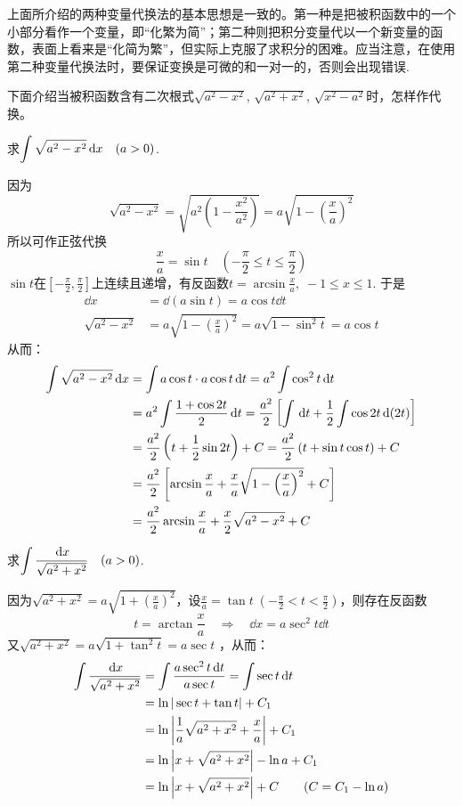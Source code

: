 上面所介绍的两种变量代换法的基本思想是一致的。第一种是把被积函数中的一个小部分看作一个变量，即“化繁为简”；第二种则把积分变量代以一个新变量的函数，表面上看来是“化简为繁”，但实际上克服了求积分的困难。应当注意，在使用第二种变量代换法时，要保证变换是可微的和一对一的，否则会出现错误.

下面介绍当被积函数含有二次根式$\sqrt{a^2-x^2}$, $\sqrt{a^2+x^2}$, $\sqrt{x^2-a^2}$时，怎样作代换。

\begin{example}
    求$\displaystyle\int \sqrt{a^2-x^2}\,{\rm d} x\quad (a>0)$.
\end{example}

\begin{solution}
因为\[\sqrt{a^2-x^2}=\sqrt{a^2\left(1-\frac{x^2}{a^2}\right)}=a\sqrt{1-\left(\frac{x}{a}\right)^2}\]
所以可作正弦代换
\[\frac{x}{a}=\sin t\quad \left(-\frac{\pi}{2}\le t\le \frac{\pi}{2}\right)\]
$\sin t$在$\left[-\frac{\pi}{2},\frac{\pi}{2}\right]$上连续且递增，有反函数$t=\arcsin\frac{x}{a},\; -1\le x\le 1$. 于是
\[\begin{split}
    \dd x&=\dd (a\sin t)=a\cos t\dd t\\
    \sqrt{a^2-x^2}&=a\sqrt{1-\left(\frac{x}{a}\right)^2}=a\sqrt{1-\sin^2 t}=a\cos t
\end{split}\]
从而：
\[\begin{split}
    \displaystyle\int \sqrt{a^2-x^2}\,{\rm d} x&=\int a\cos t\cdot a\cos t\,{\rm d} t=a^2\int \cos^2 t\,{\rm d} t\\ 
&=a^2\int \dfrac{1+\cos 2t}{2}\,{\rm d} t=\dfrac{a^2}{2}\left[\int \,{\rm d} t+\dfrac{1}{2}\int \cos 2t\,{\rm d} (2t)\right]\\
&=\dfrac{a^2}{2}\left(t+\dfrac{1}{2}\sin 2t\right)+C=\dfrac{a^2}{2}\left(t+\sin t\cos t\right)+C\\
&=\dfrac{a^2}{2}\left[\arcsin\dfrac{x}{a}+\dfrac{x}{a}\sqrt{1-\left(\dfrac{x}{a}\right)^2}+C\right]\\
&=\dfrac{a^2}{2}\arcsin\dfrac{x}{a}+\dfrac{x}{2}\sqrt{a^2-x^2}+C
\end{split}\]
\end{solution}

\begin{example}
    求$\displaystyle\int \dfrac{\,{\rm d} x}{\sqrt{a^2+x^2}}\quad (a>0)$.
\end{example}

\begin{solution}
因为$\sqrt{a^2+x^2}=a\sqrt{1+\left(\frac{x}{a}\right)^2}$，设$\frac{x}{a}=\tan t\; \left(-\frac{\pi}{2}<t<\frac{\pi}{2}\right)$，则存在反函数
\[t=\arctan\frac{x}{a}\quad \Rightarrow\quad \dd x=a\sec^2 t\dd t\]
又$\sqrt{a^2+x^2}=a\sqrt{1+\tan^2 t}=a\sec t$
，从而：
\[\begin{split}
    \displaystyle\int \dfrac{\,{\rm d} x}{\sqrt{a^2+x^2}}&=\int\dfrac{a\sec^2 t\,{\rm d} t}{a\sec t}=\int\sec t\,{\rm d} t\\
    &=\ln|\sec t+\tan t|+C_1\\
    &=\ln\left|\dfrac{1}{a}\sqrt{a^2+x^2}+\dfrac{x}{a}\right|+C_1\\
    &=\ln\left|x+\sqrt{a^2+x^2}\right|-\ln a+C_1\\
    &=\ln\left|x+\sqrt{a^2+x^2}\right|+C\qquad (C=C_1-\ln a)
\end{split}\]
\end{solution}

